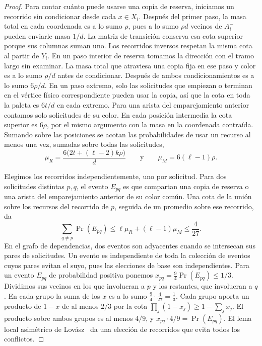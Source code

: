 \begin{proof}
Para contar cuánto puede usarse una copia de reserva, iniciamos un recorrido sin condicionar desde cada \(x\in X_i\). Después del primer paso, la masa total en cada coordenada es a lo sumo \(\rho\), pues a lo sumo \(\rho d\) vecinos de \(A_i^-\) pueden enviarle masa \(1/d\). La matriz de transición conserva esa cota superior porque sus columnas suman uno. Los recorridos inversos respetan la misma cota al partir de \(Y_i\). En un paso interior de reserva tomamos la dirección con el tramo largo sin examinar. La masa total que atraviesa una copia fija en ese paso y color es a lo sumo \(\rho/d\) antes de condicionar. Después de ambos condicionamientos es a lo sumo \(6\rho/d\). En un paso extremo, solo las solicitudes que empiezan o terminan en el vértice físico correspondiente pueden usar la copia, así que la cota en toda la paleta es \(6t/d\) en cada extremo. Para una arista del emparejamiento anterior contamos solo solicitudes de su color. En cada posición intermedia la cota superior es \(6\rho\), por el mismo argumento con la masa en la coordenada contraída. Sumando sobre las posiciones se acotan las probabilidades de usar un recurso al menos una vez, sumadas sobre todas las solicitudes,
\[
 \mu_R=\frac{6\bigl(2t+(\ell-2)k\rho\bigr)}{d}
 \qquad\text{y}\qquad
 \mu_M=6(\ell-1)\rho.
\]

Elegimos los recorridos independientemente, uno por solicitud. Para dos solicitudes distintas \(p,q\), el evento \(E_{pq}\) es que compartan una copia de reserva o una arista del emparejamiento anterior de su color común. Una cota de la unión sobre los recursos del recorrido de \(p\), seguida de un promedio sobre ese recorrido, da
\[
 \sum_{q\ne p}\Pr(E_{pq})\le\ell\mu_R+(\ell-1)\mu_M\le\frac{4}{27}.
\]
En el grafo de dependencias, dos eventos son adyacentes cuando se intersecan sus pares de solicitudes. Un evento es independiente de toda la colección de eventos cuyos pares evitan el suyo, pues las elecciones de base son independientes. Para un evento \(E_{pq}\) de probabilidad positiva ponemos \(x_{pq}=\tfrac94\Pr(E_{pq})\le1/3\). Dividimos sus vecinos en los que involucran a \(p\) y los restantes, que involucran a \(q\). En cada grupo la suma de los \(x\) es a lo sumo \(\tfrac94\cdot\tfrac4{27}=\tfrac13\). Cada grupo aporta un producto de \(1-x\) de al menos \(2/3\) por la cota \(\prod_j(1-x_j)\ge1-\sum_j x_j\). El producto sobre ambos grupos es al menos \(4/9\), y \(x_{pq}\cdot4/9=\Pr(E_{pq})\). El lema local asimétrico de Lovász~\cite{EL} da una elección de recorridos que evita todos los conflictos.


\end{proof}
